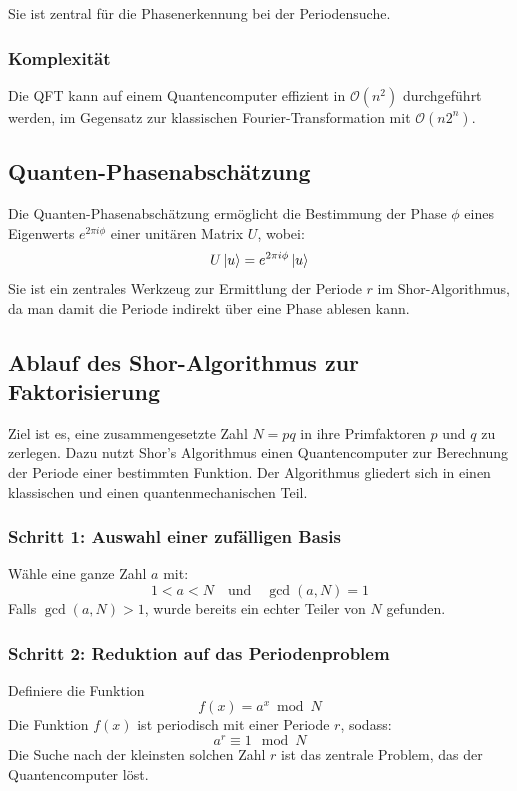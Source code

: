 \noindent Sie ist zentral für die Phasenerkennung bei der Periodensuche.

\subsubsection*{Komplexität}
Die QFT kann auf einem Quantencomputer effizient in \( \mathcal{O}(n^2) \) durchgeführt werden, im Gegensatz zur klassischen Fourier-Transformation mit \( \mathcal{O}(n 2^n) \).

\subsection{Quanten-Phasenabschätzung}

\noindent Die Quanten-Phasenabschätzung ermöglicht die Bestimmung der Phase \( \phi \) eines Eigenwerts \( e^{2\pi i \phi} \) einer unitären Matrix \( U \), wobei:
\[
U \ket{u} = e^{2\pi i \phi} \ket{u}
\]
Sie ist ein zentrales Werkzeug zur Ermittlung der Periode \( r \) im Shor-Algorithmus, da man damit die Periode indirekt über eine Phase ablesen kann.

\subsection{Ablauf des Shor-Algorithmus zur Faktorisierung}

\noindent
Ziel ist es, eine zusammengesetzte Zahl \( N = pq \) in ihre Primfaktoren \( p \) und \( q \) zu zerlegen. Dazu nutzt Shor's Algorithmus einen Quantencomputer zur Berechnung der Periode einer bestimmten Funktion. Der Algorithmus gliedert sich in einen klassischen und einen quantenmechanischen Teil.

\subsubsection*{Schritt 1: Auswahl einer zufälligen Basis}
Wähle eine ganze Zahl \( a \) mit:
\[
1 < a < N \quad \text{und} \quad \gcd(a, N) = 1
\]
Falls \( \gcd(a, N) > 1 \), wurde bereits ein echter Teiler von \( N \) gefunden.

\subsubsection*{Schritt 2: Reduktion auf das Periodenproblem}
Definiere die Funktion
\[
f(x) = a^x \bmod N
\]
Die Funktion \( f(x) \) ist periodisch mit einer Periode \( r \), sodass:
\[
a^r \equiv 1 \mod N
\]
Die Suche nach der kleinsten solchen Zahl \( r \) ist das zentrale Problem, das der Quantencomputer löst.

